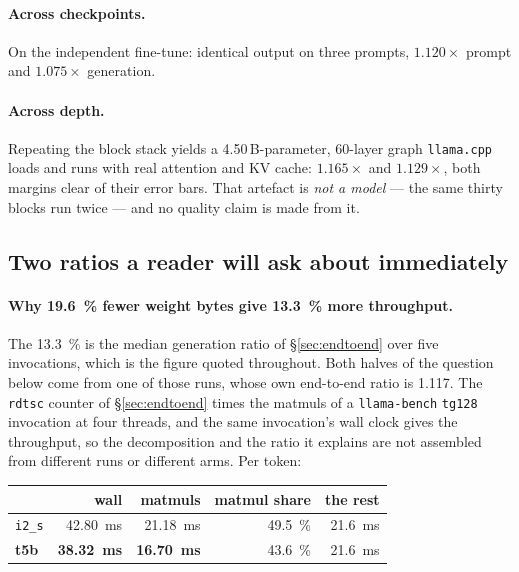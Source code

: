 \documentclass[11pt,a4paper]{article}
\newcommand{\code}[1]{\texttt{#1}}
\begin{document}
\paragraph{Across checkpoints.} On the independent fine-tune: identical output
on three prompts, $1.120\times$ prompt and $1.075\times$ generation.

\paragraph{Across depth.} Repeating the block stack yields a
\num{4.50}\,B-parameter, 60-layer graph \code{llama.cpp} loads and runs with
real attention and KV cache: $1.165\times$ and $1.129\times$, both margins clear
of their error bars. That artefact is \emph{not a model} --- the same thirty
blocks run twice --- and no quality claim is made from it.

\subsection{Two ratios a reader will ask about immediately}\label{sec:ratios}

\paragraph{Why \SI{19.6}{\percent} fewer weight bytes give \SI{13.3}{\percent}
more throughput.} The \SI{13.3}{\percent} is the median generation ratio of
\S\ref{sec:endtoend} over five invocations, which is the figure quoted
throughout. Both halves of the question below come from one of those runs, whose
own end-to-end ratio is \num{1.117}. The
\code{rdtsc} counter of \S\ref{sec:endtoend} times the matmuls of a
\code{llama-bench} \code{tg128} invocation at four threads, and the same
invocation's wall clock gives the throughput, so the decomposition and the ratio
it explains are not assembled from different runs or different arms. Per token:

\begin{center}
\begin{tabular}{lrrrr}
\toprule
 & wall & matmuls & matmul share & the rest \\
\midrule
\code{i2\_s}  & \SI{42.80}{\milli\second} & \SI{21.18}{\milli\second} & \SI{49.5}{\percent} & \SI{21.6}{\milli\second} \\
\textbf{t5b} & \textbf{\SI{38.32}{\milli\second}} & \textbf{\SI{16.70}{\milli\second}} & \SI{43.6}{\percent} & \SI{21.6}{\milli\second} \\
\bottomrule
\end{tabular}
\end{center}
\end{document}
